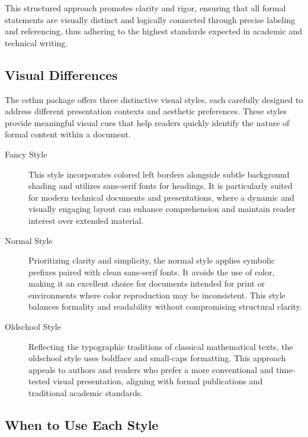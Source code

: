 \documentclass[10pt,letterpaper]{amsart}
\begin{document}
This structured approach promotes clarity and rigor, ensuring that all formal
statements are visually distinct and logically connected through precise
labeling and referencing, thus adhering to the highest standards expected in
academic and technical writing.

\subsection{Visual Differences}

The \textsf{csthm} package offers three distinctive visual styles, each
carefully designed to address different presentation contexts and aesthetic
preferences. These styles provide meaningful visual cues that help readers
quickly identify the nature of formal content within a document.

\begin{description}
	\item[Fancy Style] This style incorporates colored left borders alongside subtle
	      background shading and utilizes sans-serif fonts for headings. It is
	      particularly suited for modern technical documents and presentations, where a
	      dynamic and visually engaging layout can enhance comprehension and maintain
	      reader interest over extended material.

	\item[Normal Style] Prioritizing clarity and simplicity, the normal style applies
	      symbolic prefixes paired with clean sans-serif fonts. It avoids the use of
	      color, making it an excellent choice for documents intended for print or
	      environments where color reproduction may be inconsistent. This style balances
	      formality and readability without compromising structural clarity.

	\item[Oldschool Style] Reflecting the typographic traditions of classical
	      mathematical texts, the oldschool style uses boldface and small-caps
	      formatting. This approach appeals to authors and readers who prefer a more
	      conventional and time-tested visual presentation, aligning with formal
	      publications and traditional academic standards.
\end{description}

\subsection{When to Use Each Style}
\end{document}
